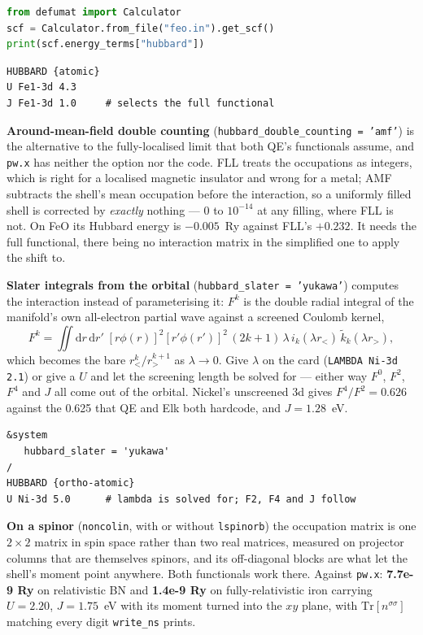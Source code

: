 \documentclass[11pt,a4paper]{article}
\newcommand{\code}[1]{\texttt{\small #1}}
\begin{document}
\begin{lstlisting}[language=Python]
from defumat import Calculator
scf = Calculator.from_file("feo.in").get_scf()
print(scf.energy_terms["hubbard"])
\end{lstlisting}

\begin{lstlisting}
HUBBARD {atomic}
U Fe1-3d 4.3
J Fe1-3d 1.0     # selects the full functional
\end{lstlisting}

\textbf{Around-mean-field double counting} (\code{hubbard\_double\_counting =
'amf'}) is the alternative to the fully-localised limit that both QE's
functionals assume, and \code{pw.x} has neither the option nor the code. FLL
treats the occupations as integers, which is right for a localised magnetic
insulator and wrong for a metal; AMF subtracts the shell's mean occupation
before the interaction, so a uniformly filled shell is corrected by
\emph{exactly} nothing --- $0$ to $10^{-14}$ at any filling, where FLL is not.
On FeO its Hubbard energy is $-0.005$~Ry against FLL's $+0.232$. It needs the
full functional, there being no interaction matrix in the simplified one to
apply the shift to.

\textbf{Slater integrals from the orbital} (\code{hubbard\_slater = 'yukawa'})
computes the interaction instead of parameterising it: $F^k$ is the double
radial integral of the manifold's own all-electron partial wave against a
screened Coulomb kernel,
%
\[
  F^k = \iint \mathrm{d}r\,\mathrm{d}r'\;
        [r\phi(r)]^2 [r'\phi(r')]^2 \,
        (2k+1)\,\lambda\, i_k(\lambda r_<)\, \tilde k_k(\lambda r_>) ,
\]
%
which becomes the bare $r_<^k/r_>^{k+1}$ as $\lambda \to 0$. Give $\lambda$ on
the card (\code{LAMBDA Ni-3d 2.1}) or give a $U$ and let the screening length be
solved for --- either way $F^0$, $F^2$, $F^4$ and $J$ all come out of the
orbital. Nickel's unscreened 3d gives $F^4/F^2 = 0.626$ against the 0.625 that
QE and Elk both hardcode, and $J = 1.28$~eV.

\begin{lstlisting}
&system
   hubbard_slater = 'yukawa'
/
HUBBARD {ortho-atomic}
U Ni-3d 5.0      # lambda is solved for; F2, F4 and J follow
\end{lstlisting}

\textbf{On a spinor} (\code{noncolin}, with or without \code{lspinorb}) the
occupation matrix is one $2\times2$ matrix in spin space rather than two real
matrices, measured on projector columns that are themselves spinors, and its
off-diagonal blocks are what let the shell's moment point anywhere. Both
functionals work there. Against \code{pw.x}: \textbf{7.7e-9 Ry} on relativistic
BN and \textbf{1.4e-9 Ry} on fully-relativistic iron carrying $U = 2.20$,
$J = 1.75$~eV with its moment turned into the $xy$ plane, with
$\mathrm{Tr}[n^{\sigma\sigma}]$ matching every digit \code{write\_ns} prints.
\end{document}
